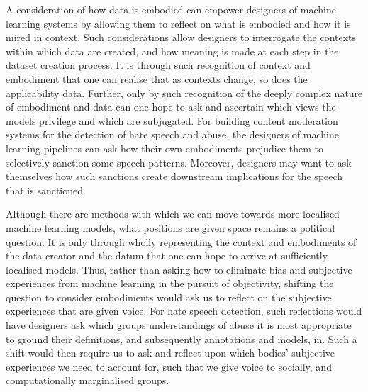 {A consideration of how data is embodied can empower designers of machine learning systems by allowing them to reflect on what is embodied and how it is mired in context.
Such considerations allow designers to interrogate the contexts within which data are created, and how meaning is made at each step in the dataset creation process.
It is through such recognition of context and embodiment that one can realise that as contexts change, so does the applicability data.
Further, only by such recognition of the deeply complex nature of embodiment and data can one hope to ask and ascertain which views the models privilege and which are subjugated.
For building content moderation systems for the detection of hate speech and abuse, the designers of machine learning pipelines can ask how their own embodiments prejudice them to selectively sanction some speech patterns.
Moreover, designers may want to ask themselves how such sanctions create downstream implications for the speech that is sanctioned.

Although there are methods with which we can move towards more localised machine learning models, what positions are given space remains a political question.
It is only through wholly representing the context and embodiments of the data creator and the datum that one can hope to arrive at sufficiently localised models.
Thus, rather than asking how to eliminate bias and subjective experiences from machine learning in the pursuit of objectivity, shifting the question to consider embodiments would ask us to reflect on the subjective experiences that are given voice.
For hate speech detection, such reflections would have designers ask which groups understandings of abuse it is most appropriate to ground their definitions, and subsequently annotations and models, in.
Such a shift would then require us to ask and reflect upon which bodies' subjective experiences we need to account for, such that we give voice to socially, and computationally marginalised groups.

}
